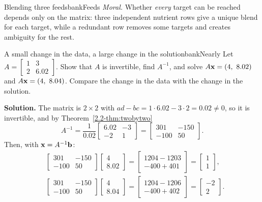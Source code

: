 \documentclass[11pt]{article}
\begin{document}
\begin{exmp}{Blending three feeds}{bankFeeds}
\emph{Moral.} Whether \emph{every} target can be reached depends only on the matrix: three independent nutrient rows give a unique blend for each target, while a redundant row removes some targets and creates ambiguity for the rest.
\end{exmp}

\begin{exmp}{A small change in the data, a large change in the solution}{bankNearly}
Let $A=\begin{bmatrix}1&3\\2&6.02\end{bmatrix}$. Show that $A$ is invertible, find $A^{-1}$, and solve $A\mathbf{x}=(4,\ 8.02)$ and $A\mathbf{x}=(4,\ 8.04)$. Compare the change in the data with the change in the solution.

\textbf{Solution.} The matrix is $2\times2$ with $ad-bc=1\cdot6.02-3\cdot2=0.02\neq0$, so it is invertible, and by Theorem~\ref{2.2-thm:twobytwo}
\[
A^{-1}=\frac1{0.02}\begin{bmatrix}6.02&-3\\-2&1\end{bmatrix}=\begin{bmatrix}301&-150\\-100&50\end{bmatrix}.
\]
Then, with $\mathbf{x}=A^{-1}\mathbf{b}$:
\begin{align*}
&\begin{bmatrix}301&-150\\-100&50\end{bmatrix}\begin{bmatrix}4\\8.02\end{bmatrix}=\begin{bmatrix}1204-1203\\-400+401\end{bmatrix}=\begin{bmatrix}1\\1\end{bmatrix},\\[4pt]
&\begin{bmatrix}301&-150\\-100&50\end{bmatrix}\begin{bmatrix}4\\8.04\end{bmatrix}=\begin{bmatrix}1204-1206\\-400+402\end{bmatrix}=\begin{bmatrix}-2\\2\end{bmatrix}.

\end{align*}
\end{exmp}
\end{document}
